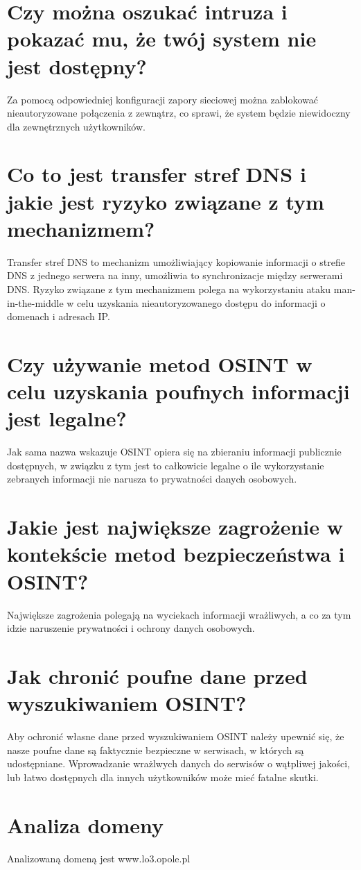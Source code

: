 \documentclass{article}
\begin{document}
\section*{Czy można oszukać intruza i pokazać mu, że twój system nie jest dostępny?}
Za pomocą odpowiedniej konfiguracji zapory sieciowej można zablokować nieautoryzowane połączenia z zewnątrz, co sprawi, że system będzie niewidoczny dla zewnętrznych użytkowników.
\section*{Co to jest transfer stref DNS i jakie jest ryzyko związane z tym mechanizmem?}
Transfer stref DNS to mechanizm umożliwiający kopiowanie informacji o strefie DNS z jednego serwera na inny, umożliwia to synchronizacje między serwerami DNS.
Ryzyko związane z tym mechanizmem polega na wykorzystaniu ataku man-in-the-middle w celu uzyskania nieautoryzowanego dostępu do informacji o domenach i adresach IP.
\section*{Czy używanie metod OSINT w celu uzyskania poufnych informacji jest legalne?}
Jak sama nazwa wskazuje OSINT opiera się na zbieraniu informacji publicznie dostępnych, w związku z tym jest to całkowicie legalne o ile wykorzystanie zebranych informacji nie narusza to prywatności danych osobowych.
\section*{Jakie jest największe zagrożenie w kontekście metod bezpieczeństwa i OSINT?}
Największe zagrożenia polegają na wyciekach informacji wrażliwych, a co za tym idzie naruszenie prywatności i ochrony danych osobowych.
\section*{Jak chronić poufne dane przed wyszukiwaniem OSINT?}
Aby ochronić własne dane przed wyszukiwaniem OSINT należy upewnić się, że nasze poufne dane są faktycznie bezpieczne w serwisach, w których są udostępniane.
Wprowadzanie wrażlwych danych do serwisów o wątpliwej jakości, lub łatwo dostępnych dla innych użytkowników może mieć fatalne skutki.
\section*{Analiza domeny}
Analizowaną domeną jest www.lo3.opole.pl
\end{document}
